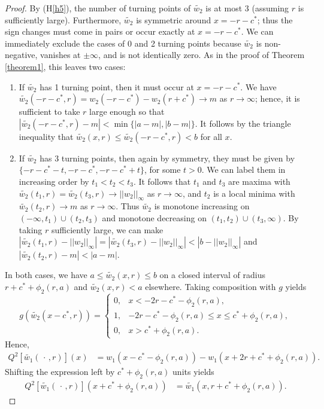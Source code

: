 \documentclass[11pt]{article}
\theoremstyle{definition}
\numberwithin{equation}{section}
\numberwithin{thm}{section}
\newcommand{\wone}{w_1}
\newcommand{\wtwo}{w_2}
\renewcommand{\a}{a}
\renewcommand{\b}{b}
\newcommand{\m}{m}
\newcommand{\blank}{\,\cdot\,}
\newcommand{\what}{\tilde{\wone}}
\newcommand{\whattwo}{\tilde{\wtwo}}
\newcommand{\hypref}[1]{{(H{\ref{#1}})}}
\begin{document}
\begin{proof}
By \hypref{h5}, the number of turning points of $\whattwo$ is at most 3 (assuming $r$ is sufficiently large).
Furthermore, $\whattwo$ is symmetric around $x=-r-c^*$; thus the sign changes must come in pairs or occur exactly at $x=-r-c^*$.
We can immediately exclude the cases of 0 and 2 turning points because $\whattwo$ is non-negative, vanishes at $\pm\infty$, and is not identically zero.
As in the proof of Theorem \ref{theorem1}, this leaves two cases:
\begin{enumerate}[{Case} 1.]

\item If $\whattwo$ has 1 turning point, then it must occur at $x=-r-c^*$.
We have $\whattwo(-r-c^*,r) = w_2(-r-c^*) - w_2(r+c^*) \to \m$ as $r \to \infty$; hence, it is sufficient to take $r$ large enough so that $|\whattwo(-r-c^*,r) - \m| < \min\{|\a-\m|,|\b-\m|\}$.
It follows by the triangle inequality that $\whattwo(x,r) \leq \whattwo(-r-c^*,r) < \b$ for all $x$.

\item If $\whattwo$ has 3 turning points, then again by symmetry, they must be given by $\{-r-c^*-t, -r-c^*, -r-c^*+t\}$, for some $t>0$.
We can label them in increasing order by $t_1<t_2<t_3$.
It follows that $t_1$ and $t_3$ are maxima with $\whattwo(t_1,r)=\whattwo(t_3,r) \to ||w_2||_\infty$ as $r\to\infty$, and $t_2$ is a local minima with $\whattwo(t_2,r) \to \m$ as $r\to\infty$.
Thus $\whattwo$ is monotone increasing on $(-\infty,t_1)\cup(t_2,t_3)$ and monotone decreasing on $(t_1,t_2)\cup(t_3,\infty)$.
By taking $r$ sufficiently large, we can make $\left| \whattwo(t_1,r)-||w_2||_\infty \right| = \left| \whattwo(t_3,r)-||w_2||_\infty \right| < \left| \b-||w_2||_\infty \right| $ and $\left| \whattwo(t_2,r)-\m \right| < \left| \a-\m \right|$.
\end{enumerate}

In both cases, we have $\a \leq \whattwo(x,r) \leq \b$ on a closed interval of radius $r + c^* + \phi_2(r,a)$ and $\whattwo(x,r) < a$ elsewhere.
Taking composition with $g$ yields
$$
g(\whattwo(x-c^*,r)) = \begin{cases}
0, & x < -2r - c^* -\phi_2(r,\a), \\
1, & -2r - c^* -\phi_2(r,\a) \leq x \leq c^* + \phi_2(r,\a) ,\\
0, & x > c^* + \phi_2(r,\a).
\end{cases}
$$
Hence,
$$ \begin{aligned}
Q^2 [\what(\blank,r)] (x) &= w_1(x-c^* - \phi_2(r,a)) - w_1(x+2r+c^*+\phi_2(r,a)) .
\end{aligned} $$
Shifting the expression left by $c^*+\phi_2(r,a)$ units yields
\begin{equation} \begin{aligned} \label{appliedqtwice}
Q^2 [\what(\blank,r)] (x+c^*+\phi_2(r,a)) 
&= \what(x, r+c^*+\phi_2(r,\a)).
\end{aligned} \end{equation}


\end{proof}
\end{document}
